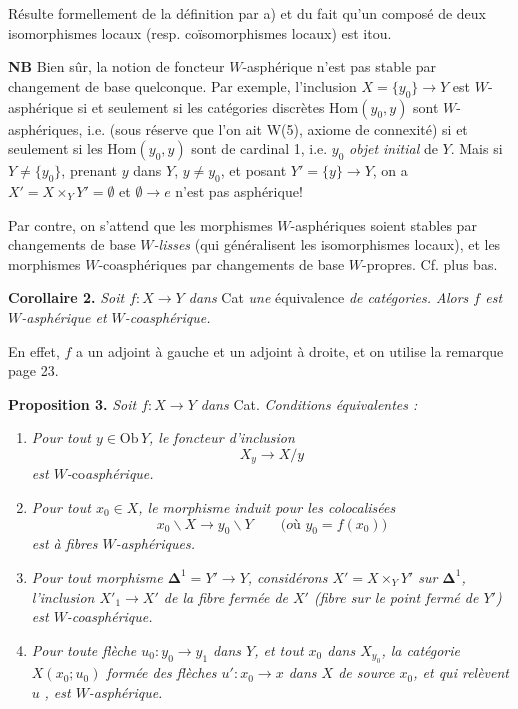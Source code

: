 \documentclass[11pt,leqno]{article}
\newcommand{\printedpage}[1]{\marginpar{\footnotesize p.~#1}}
\newcommand{\msp}[1]{\marginpar{\footnotesize [#1]}}
\newcommand{\Ob}{\mathrm{Ob}\,}
\begin{document}
Résulte formellement de la définition par a) et du fait qu'un composé de deux isomorphismes locaux (resp. coïsomorphismes locaux) est itou.

\textbf{NB} Bien sûr, la notion de foncteur $W$-asphérique n'est pas stable par changement de base quelconque. Par exemple, l'inclusion $X = \{y_0\} \longrightarrow Y$ est $W$-asphérique si et seulement si les catégories discrètes $\mathrm{Hom}(y_0, y)$ sont $W$-asphériques, i.e. (sous réserve que l'on ait W(5), axiome de connexité) si et seulement si les $\mathrm{Hom}(y_0, y)$ sont de cardinal 1, i.e. $y_0$ \textit{objet initial} de $Y$. Mais si $Y \neq \{y_0\}$, prenant $y$ dans $Y$, $y \neq y_0$, et posant $Y' = \{y\} \longrightarrow Y$, on a $X' = X \times_Y Y' = \emptyset$ et $\emptyset \longrightarrow e$ n'est pas asphérique!

\msp{page 26}Par contre, on s'attend que les morphismes $W$-asphériques soient stables par changements de base \textit{$W$-lisses} (qui généralisent les isomorphismes locaux), et les morphismes $W$-coasphériques par changements de base $W$-propres. Cf. plus bas.

\textbf{Corollaire 2.} \textit{Soit $f : X \longrightarrow Y$ dans} \textup{Cat} \textit{une} \textup{équivalence} \textit{de catégories. Alors $f$ est $W$-asphérique et $W$-coasphérique.}

En effet, $f$ a un adjoint à gauche et un adjoint à droite, et on utilise la remarque page 23.

\textbf{Proposition 3.} \textit{Soit $f : X \longrightarrow Y$ dans} \textup{Cat}. \textit{Conditions équivalentes :}

\printedpage{22}

\begin{enumerate}
\item[\textit{a)}] \textit{Pour tout $y \in \Ob Y$, le foncteur d'inclusion}
\[
X_y \longrightarrow X/y \tag*{$(*)$}
\]
\textit{est $W$-}co\textit{asphérique.}
\item[\textit{b)}] \textit{Pour tout $x_0 \in X$, le morphisme induit pour les colocalisées}
\[
x_0\backslash X \longrightarrow y_0\backslash Y \qquad \textit{(où $y_0 = f(x_0)$)}
\]
\textit{est à fibres $W$-asphériques.}
\item[\textit{c)}] \textit{Pour tout morphisme $\mathbf{\Delta}^1 = Y' \longrightarrow Y$, considérons $X' = X \times_Y Y'$ sur $\mathbf{\Delta}^1$, l'inclusion $X'_1 \longrightarrow X'$ de la fibre fermée de $X'$ (fibre sur le point fermé de $Y'$) est $W$-coasphérique.}
\item[\textit{d)}] \textit{Pour toute flèche $u_0 : y_0 \longrightarrow y_1$ dans $Y$, et tout $x_0$ dans $X_{y_0}$, la catégorie $X(x_0;u_0)$ formée des flèches $u' : x_0 \longrightarrow x$ dans $X$ de source $x_0$, et qui relèvent $u$} \textit{, est $W$-asphérique.}
\end{enumerate}
\end{document}
